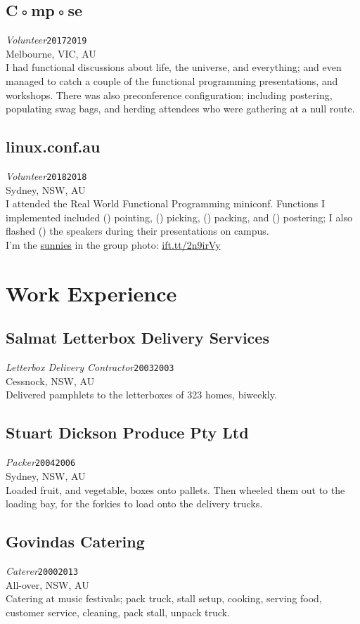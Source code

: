 \documentclass[12pt,a4paper,oneside]{article}
\newcommand{\xp}[6]{{\normalsize\textit{#1}\hfill\texttt{#5}\\\phantom{menace}\hfill#2, #3, #4}\\}
\newcommand{\textapprox}{\raisebox{0.5ex}{\texttildelow}}
\newcommand{\sh}[1]{{\color{gray}{#1}}}
\begin{document}
\subsection{C◦mp◦se}
\xp{Volunteer}{Melbourne}{VIC}{AU}{2017\textapprox{}2019}
\\I had functional discussions about life, the universe, and everything; and even managed to catch a couple of the functional programming presentations, and workshops. There was also preconference configuration; including postering, populating swag bags, and herding attendees who were gathering at a null route.
\subsection{linux.conf.au}
\xp{Volunteer}{Sydney}{NSW}{AU}{2018\textapprox{}2018}
\\I attended the Real World Functional Programming miniconf. Functions I implemented included (\sh{directional}) pointing, (\sh{order}) picking, (\sh{box}) packing, and (\sh{navigational}) postering; I also flashed (\sh{cards at}) the speakers during their presentations on campus.
\\I'm the \href{https://www.flickr.com/photos/superroach/24972750417/}{sunnies} in the group photo: \href{https://twitter.com/developerjack/status/956790324126511104}{ift.tt/2n9irVy}

\section{Work Experience}
\subsection{Salmat Letterbox Delivery Services}
\xp{Letterbox Delivery Contractor}{Cessnock}{NSW}{AU}{2003\textapprox{}2003}
\\Delivered pamphlets to the letterboxes of 323 homes, biweekly.
\subsection{Stuart Dickson Produce Pty Ltd}
\xp{Packer}{Sydney}{NSW}{AU}{2004\textapprox{}2006}
\\Loaded fruit, and vegetable, boxes onto pallets. Then wheeled them out to the loading bay, for the forkies to load onto the delivery trucks.
\subsection{Govindas Catering}
\xp{Caterer}{All-over}{NSW}{AU}{2000\textapprox{}2013}
\\Catering at music festivals; pack truck, stall setup, cooking, serving food, customer service, cleaning, pack stall, unpack truck.
\end{document}
